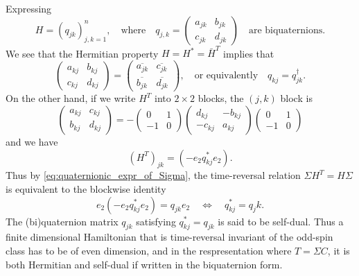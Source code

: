 \documentclass[11pt, a4paper]{article}
\numberwithin{equation}{section}
\theoremstyle{definition}
\theoremstyle{remark}
\begin{document}
Expressing
\begin{equation}
  H = (q_{jk})^n_{j, k = 1}, \quad \text{where} \quad q_{j, k} =
  \begin{pmatrix}
    a_{jk} & b_{jk} \\
    c_{jk} & d_{jk}
  \end{pmatrix}
  \quad \text{are biquaternions.}
\end{equation}
We see that the Hermitian property $H = H^* = \bar{H}^T$ implies that
\begin{equation}
  \begin{pmatrix}
    a_{kj} & b_{kj} \\
    c_{kj} & d_{kj}
  \end{pmatrix}
  =
  \begin{pmatrix}
    \overline{a_{jk}} & \overline{c_{jk}} \\
    \overline{b_{jk}} & \overline{d_{jk}} 
  \end{pmatrix},
  \quad \text{or equivalently} \quad q_{kj} = q^{\dagger}_{jk}.
\end{equation}
On the other hand, if we write $H^T$ into $2 \times 2$ blocks, the $(j, k)$ block is
\begin{equation}
  \begin{pmatrix}
    a_{kj} & c_{kj} \\
    b_{kj} & d_{kj}
  \end{pmatrix}
  = -
  \begin{pmatrix}
    0 & 1 \\
    -1 & 0
  \end{pmatrix}
  \begin{pmatrix}
    d_{kj} & -b_{kj} \\
    -c_{kj} & a_{kj}
  \end{pmatrix}
  \begin{pmatrix}
    0 & 1 \\
    -1 & 0
  \end{pmatrix}
\end{equation}
and we have
\begin{equation}
  (H^T)_{jk} = (-e_2 q^*_{kj} e_2).
\end{equation}
Thus by \eqref{eq:quaternionic_expr_of_Sigma}, the time-reversal relation $\Sigma H^T = H \Sigma$ is equivalent to the blockwise identity
\begin{equation}
  e_2 (-e_2 q^*_{kj} e_2) = q_{jk} e_2 \quad \Leftrightarrow \quad q^*_{kj} = q_jk.
\end{equation}
The (bi)quaternion matrix $q_{jk}$ satisfying $q^*_{kj} = q_{jk}$ is said to be self-dual. Thus a finite dimensional Hamiltonian that is time-reversal invariant of the odd-spin class has to be of even dimension, and in the respresentation where $T = \Sigma C$, it is both Hermitian and self-dual if written in the biquaternion form.
\end{document}
